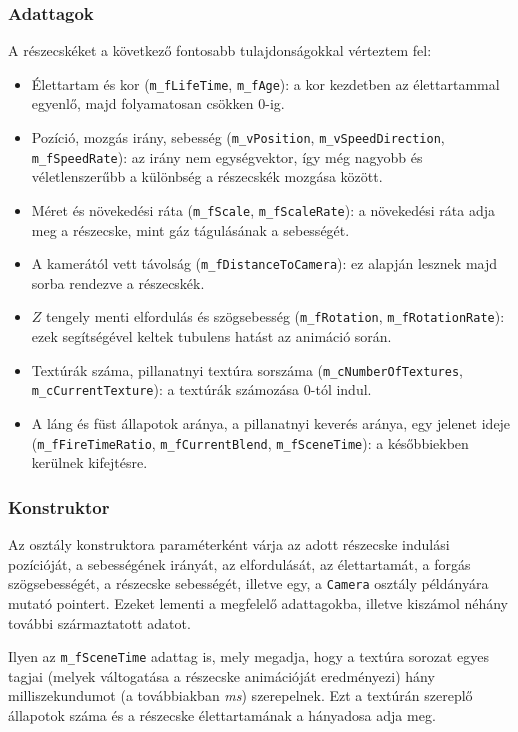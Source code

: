 \subsubsection{Adattagok}
A részecskéket a következő fontosabb tulajdonságokkal vérteztem fel:
\begin{itemize}
\item Élettartam és kor (\texttt{m\_fLifeTime}, \texttt{m\_fAge}): a kor kezdetben az élettartammal egyenlő, majd folyamatosan csökken $0$-ig.
\item Pozíció, mozgás irány, sebesség (\texttt{m\_vPosition}, \texttt{m\_vSpeedDirection}, \texttt{m\_fSpeedRate}): az irány nem egységvektor, így még nagyobb és véletlenszerűbb a különbség a részecskék mozgása között.
\item Méret és növekedési ráta (\texttt{m\_fScale}, \texttt{m\_fScaleRate}): a növekedési ráta adja meg a részecske, mint gáz tágulásának a sebességét.
\item A kamerától vett távolság (\texttt{m\_fDistanceToCamera}): ez alapján lesznek majd sorba rendezve a részecskék.
\item $Z$ tengely menti elfordulás és szögsebesség (\texttt{m\_fRotation}, \texttt{m\_fRotationRate}): ezek segítségével keltek tubulens hatást az animáció során.
\item Textúrák száma, pillanatnyi textúra sorszáma (\texttt{m\_cNumberOfTextures}, \\ \texttt{m\_cCurrentTexture}): a textúrák számozása $0$-tól indul.
\item A láng és füst állapotok aránya, a pillanatnyi keverés aránya, egy jelenet ideje (\texttt{m\_fFireTimeRatio}, \texttt{m\_fCurrentBlend}, \texttt{m\_fSceneTime}): a későbbiekben kerülnek kifejtésre.
\end{itemize}

\subsubsection{Konstruktor}
Az osztály konstruktora paraméterként várja az adott részecske indulási pozícióját, a sebességének irányát, az elfordulását, az élettartamát, a forgás szögsebességét, a részecske sebességét, illetve egy, a \texttt{Camera} osztály példányára mutató pointert. Ezeket lementi a megfelelő adattagokba, illetve kiszámol néhány további származtatott adatot. 

Ilyen az \texttt{m\_fSceneTime} adattag is, mely megadja, hogy a textúra sorozat egyes tagjai (melyek váltogatása a részecske animációját eredményezi) hány milliszekundumot (a továbbiakban \textit{ms}) szerepelnek. Ezt a textúrán szereplő állapotok száma és a részecske élettartamának a hányadosa adja meg. 


